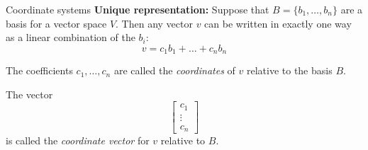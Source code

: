 \documentclass[
  ignorenonframetext,
]{beamer}
\begin{document}
\begin{frame}{Coordinate systems}
\label{coordinate-systems}
\textbf{Unique representation:} Suppose that \(B=\{b_1,\ldots, b_n\}\)
are a basis for a vector space \(V\). Then any vector \(v\) can be
written in exactly one way as a linear combination of the \(b_{i}\): \[
v = c_1 b_1+\ldots+c_n b_n
\]

The coefficients \(c_1,\ldots, c_n\) are called the \emph{coordinates}
of \(v\) relative to the basis \(B\).

The vector \[
\left[\begin{matrix} c_1 \\ \vdots \\ c_n\end{matrix}\right]
\] is called the \emph{coordinate vector} for \(v\) relative to \(B\).
\end{frame}
\end{document}
